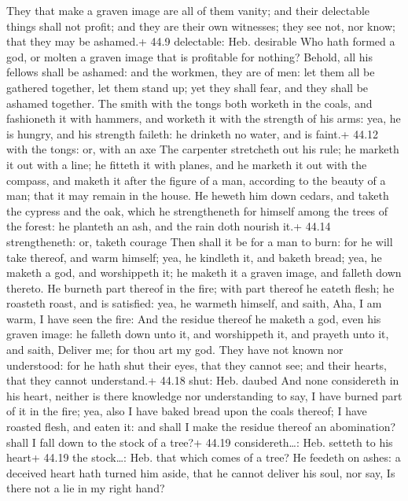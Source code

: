  They that make a graven image are all of them vanity; and
their delectable things shall not profit; and they are their own
witnesses; they see not, nor know; that they may be ashamed.+ 44.9
delectable: Heb. desirable  Who hath formed a god, or
molten a graven image that is profitable for nothing? 
Behold, all his fellows shall be ashamed: and the workmen, they are of
men: let them all be gathered together, let them stand up; yet they
shall fear, and they shall be ashamed together.  The smith
with the tongs both worketh in the coals, and fashioneth it with
hammers, and worketh it with the strength of his arms: yea, he is
hungry, and his strength faileth: he drinketh no water, and is faint.+
44.12 with the tongs: or, with an axe  The carpenter
stretcheth out his rule; he marketh it out with a line; he fitteth it
with planes, and he marketh it out with the compass, and maketh it after
the figure of a man, according to the beauty of a man; that it may
remain in the house.  He heweth him down cedars, and taketh
the cypress and the oak, which he strengtheneth for himself among the
trees of the forest: he planteth an ash, and the rain doth nourish it.+
44.14 strengtheneth: or, taketh courage  Then shall it be
for a man to burn: for he will take thereof, and warm himself; yea, he
kindleth it, and baketh bread; yea, he maketh a god, and worshippeth it;
he maketh it a graven image, and falleth down thereto.  He
burneth part thereof in the fire; with part thereof he eateth flesh; he
roasteth roast, and is satisfied: yea, he warmeth himself, and saith,
Aha, I am warm, I have seen the fire:  And the residue
thereof he maketh a god, even his graven image: he falleth down unto it,
and worshippeth it, and prayeth unto it, and saith, Deliver me; for thou
art my god.  They have not known nor understood: for he
hath shut their eyes, that they cannot see; and their hearts, that they
cannot understand.+ 44.18 shut: Heb. daubed  And none
considereth in his heart, neither is there knowledge nor understanding
to say, I have burned part of it in the fire; yea, also I have baked
bread upon the coals thereof; I have roasted flesh, and eaten it: and
shall I make the residue thereof an abomination? shall I fall down to
the stock of a tree?+ 44.19 considereth\ldots: Heb. setteth to his
heart+ 44.19 the stock\ldots: Heb. that which comes of a tree?
 He feedeth on ashes: a deceived heart hath turned him
aside, that he cannot deliver his soul, nor say, Is there not a lie in
my right hand?

